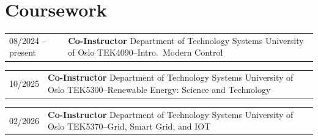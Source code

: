 
\newrefcontext[labelprefix=PhD]
\printbibliography[title={PhD Supervision}, type=phdstudent, resetnumbers=true]

\newrefcontext[labelprefix=MT]
\printbibliography[title={Supervised Master's Theses \& Projects}, type=masterstudent, resetnumbers=true]



\newrefcontext[labelprefix=UG]
\printbibliography[title={Supervised Undergraduate Capstones \& Projects},type=undergraduate, resetnumbers=true]




\renewcommand{\arraystretch}{1}
\section*{Coursework}
\begin{tabular}{p{} p{}}
  08/2024 -- present & \textbf{Co-Instructor} \newline
                       Department of Technology Systems \newline
                       University of Oslo \newline
                       TEK4090--Intro.~Modern Control
\end{tabular}

\begin{tabular}{p{} p{}}
  10/2025            & \textbf{Co-Instructor} \newline
                       Department of Technology Systems \newline
                       University of Oslo \newline
                       TEK5300--Renewable Energy: Science and Technology 
\end{tabular}

\begin{tabular}{p{} p{}}
  02/2026            & \textbf{Co-Instructor} \newline
                       Department of Technology Systems \newline
                       University of Oslo \newline
                       TEK5370--Grid, Smart Grid, and IOT
\end{tabular}

